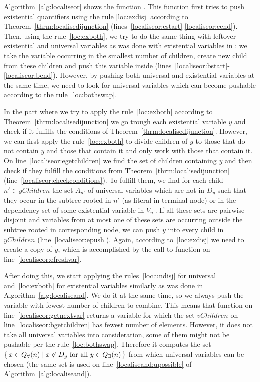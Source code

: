 \documentclass[
  digital, %
  color,
  twoside, %
  table,   %
  nolof,     %
  nolot,     %
]{fithesis3}
\let\setbuilder\set
\newcommand{\simpleset}[1]{\{{#1}\}}
\renewcommand{\set}[1]{\normalexpandarg\IfSubStr{#1}{|}{\setbuilder{#1}}{\simpleset{#1}}}
\theoremstyle{definition}
\theoremstyle{remark}
\newcommand{\vars}[1]{V_{#1}}
\newcommand{\eprefix}[1]{Q_{\exists}(#1)}
\newcommand{\uprefix}[1]{Q_{\forall}(#1)}
\begin{document}
Algorithm~\ref{alg:localiseor} shows the function . This function first tries to push existential quantifiers using the rule \eqref{loc:exdisj} according to Theorem~\ref{thrm:localisedijunction} (lines~\ref{localiseor:estart}-\ref{localiseor:eend}). Then, using the rule~\eqref{loc:exboth}, we try to do the same thing with leftover existential and universal variables as was done with existential variables in : we take the variable occurring in the smallest number of children, create new child from these children and push this variable inside (lines~\ref{localiseor:bstart}-\ref{localiseor:bend}). However, by pushing both universal and existential variables at the same time, we need to look for universal variables which can become pushable according to the rule~\eqref{loc:bothswap}.

In the part where we try to apply the rule~\eqref{loc:exboth} according to Theorem~\ref{thrm:localisedijunction} we go trough each existential variable $y$ and check if it fulfills the conditions of Theorem~\ref{thrm:localisedijunction}. However, we can first apply the rule~\eqref{loc:exboth} to divide children of $y$ to those that do not contain $y$ and those that contain it and only work with those that contain it. On line~\ref{localiseor:egetchildren} we find the set of children containing $y$ and then check if they fulfill the conditions from Theorem~\ref{thrm:localisedijunction} (line~\ref{localiseor:checkconditions}). To fulfill them, we find for each child $n' \in yChildren$ the set $A_{n'}$ of universal variables which are not in $D_y$ such that they occur in the subtree rooted in $n'$ (as literal in terminal node) or in the dependency set of some existential variable in $\vars{n'}$. If all these sets are pairwise disjoint and variables from at most one of these sets are occurring outside the subtree rooted in corresponding node, we can push $y$ into every child in $yChildren$ (line~\ref{localiseor:epush}). Again, according to~\eqref{loc:exdisj} we need to create a copy of $y$, which is accomplished by the call to function  on line~\ref{localiseor:efreshvar}.

After doing this, we start applying the rules~\eqref{loc:undisj} for universal and~\eqref{loc:exboth} for existential variables similarly as was done in Algorithm~\ref{alg:localiseand}. We do it at the same time, so we always push the variable with fewest number of children to combine. This means that function  on line~\ref{localiseor:getnextvar} returns a variable for which the set $vChildren$ on line~\ref{localiseor:bgetchildren} has fewest number of elements. However, it does not take all universal variables into consideration, some of them might not be pushable per the rule~\eqref{loc:bothswap}. Therefore it computes the set $\set{x \in \uprefix{n} | x \not\in D_y \text{ for all } y \in \eprefix{n}}$ from which universal variables can be chosen (the same set is used on line~\ref{localiseand:upossible} of Algorithm~\ref{alg:localiseand}).
\end{document}
